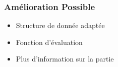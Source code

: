 \begin{frame}
  \frametitle{Amélioration Possible}
  \begin{itemize}
    \item<2-> Structure de donnée adaptée
    \item<3-> Fonction d'évaluation
    \item<4-> Plus d'information sur la partie
  \end{itemize}
\end{frame}
